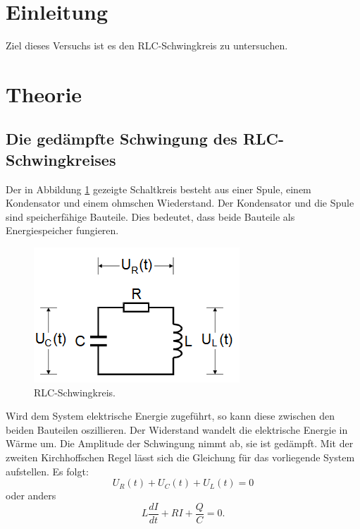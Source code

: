 \section{Einleitung}
Ziel dieses Versuchs ist es den RLC-Schwingkreis zu untersuchen.
\section{Theorie}
\label{sec:Theorie}
\subsection{Die gedämpfte Schwingung des RLC-Schwingkreises}
Der in Abbildung \ref{fig:rlc} gezeigte Schaltkreis besteht aus einer Spule, einem Kondensator und einem ohmschen Wiederstand.
Der Kondensator und die Spule sind speicherfähige Bauteile.
Dies bedeutet, dass beide Bauteile als Energiespeicher fungieren.
\begin{figure}[H]
    \centering
    \caption{RLC-Schwingkreis.\cite{v354}}
    \label{fig:rlc}
    \includegraphics[width=\textwidth-20em]{content/RLCKreis.png}
\end{figure}
\noindent
Wird dem System elektrische Energie zugeführt, so kann diese zwischen den beiden Bauteilen oszillieren.
Der Widerstand wandelt die elektrische Energie in Wärme um.
Die Amplitude der Schwingung nimmt ab, sie ist gedämpft.
Mit der zweiten Kirchhoffschen Regel lässt sich die Gleichung für das vorliegende System aufstellen.
Es folgt:
\begin{equation}
  U_R(t)+U_C(t)+U_L(t) = 0
\end{equation}
oder anders
\begin{equation}
  \label{eq:gl1}
  L\frac{dI}{dt}+RI+\frac{Q}{C}=0 .
\end{equation}
